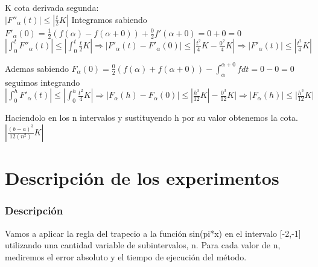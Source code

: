 \documentclass{beamer}
\begin{document}
\begin {frame}
K cota derivada segunda:\\
$|F''_\alpha(t)| \leq |\frac{t}{2} K|$
Integramos sabiendo $F'_\alpha(0)=\frac {1}{2} \left(f(\alpha)-f(\alpha+0) \right)+ \frac{0}{2} f'(\alpha+0)=0+0=0$\\

$|\int_0^t F''_\alpha(t)| \leq |\int_0^t\frac{t}{2} K| \Rightarrow |F'_\alpha(t)-F'_\alpha(0)| \leq |\frac{t^2}{4} K-\frac{0^2}{4} K| \Rightarrow |F'_\alpha(t)| \leq |\frac{t^2}{4} K|$

Ademas sabiendo
$F_\alpha(0)=\frac{0}{2} \left(f(\alpha)+f(\alpha+0) \right)-\int_\alpha ^{\alpha+0} f dt=0-0=0$ seguimos integrando\\

$|\int_0^h F'_\alpha(t)|\leq|\int_0^h \frac{t^2}{4} K| \Rightarrow |F_\alpha(h)-F_\alpha(0)| \leq |\frac{h^3}{12} K|-\frac{0^3}{12} K|\Rightarrow |F_\alpha(h)| \leq |\frac{h^3}{12} K|$

Haciendolo en los n intervalos y sustituyendo h por su valor obtenemos la cota.\\

$|\frac{(b-a)^3}{12 (n^2)} K|$
\end{frame}
\section{Descripción de los experimentos}
\begin{frame}
  \frametitle{Descripción}
  Vamos a aplicar la regla del trapecio a la función sin(pi*x) en el intervalo [-2,-1] utilizando una cantidad variable de subintervalos, n. Para cada valor de n, mediremos el error absoluto y el tiempo de ejecución del método.
\end{frame}
\end{document}

